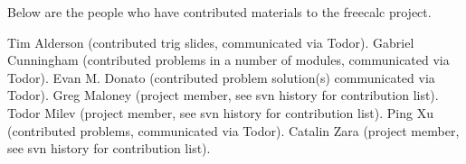 Below are the people who have contributed materials to the freecalc project.

Tim Alderson (contributed trig slides, communicated via Todor).
Gabriel Cunningham (contributed problems in a number of modules, communicated via Todor).
Evan M. Donato (contributed problem solution(s) communicated via Todor).
Greg Maloney (project member, see svn history for contribution list).
Todor Milev (project member, see svn history for contribution list).
Ping Xu (contributed problems, communicated via Todor).
Catalin Zara (project member, see svn history for contribution list).
